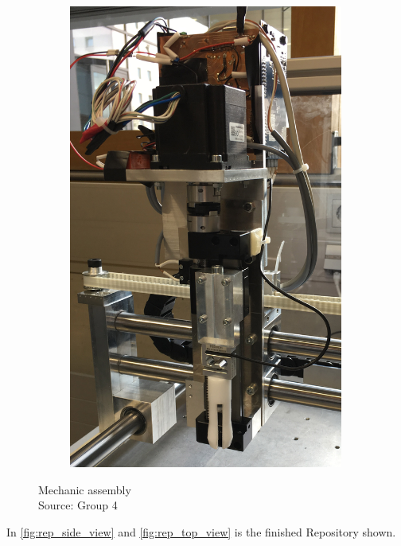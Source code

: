 \documentclass[a4paper,12pt]{scrreprt}
\begin{document}
\begin{figure} [H]
\begin{subfigure}[b]{0.45\textwidth}
                \centering
                \includegraphics[width=0.99\textwidth]{pictures/Seitl_2}
        \end{subfigure}
        \caption[Mechanic assembly]{Mechanic assembly\\
         Source: Group 4}\label{fig:mechanic assembly}
  \end{figure}
  \newpage
   In \autoref{fig:rep_side_view} and \autoref{fig:rep_top_view} is the finished \acs{Repository} shown.
\end{document}
